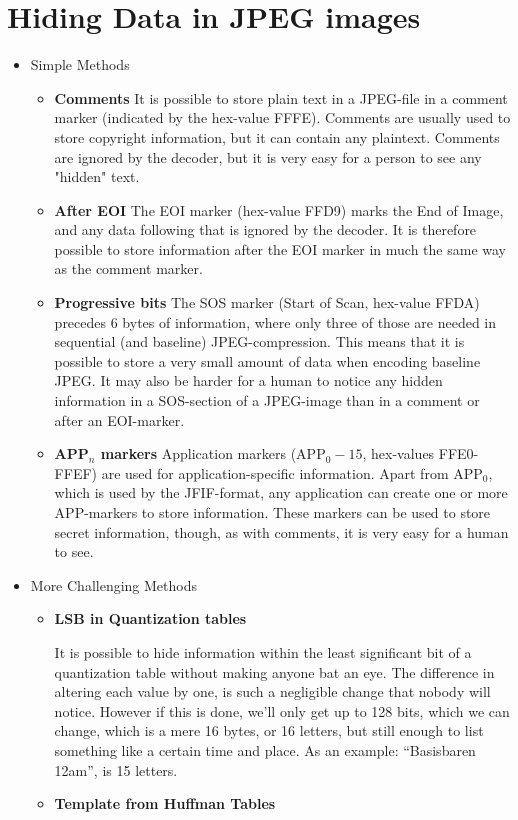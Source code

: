 
\section{Hiding Data in JPEG images}

\begin{itemize}
	\item Simple Methods
	\begin{itemize}
		\item \textbf{Comments}
		It is possible to store plain text in a JPEG-file in a comment marker (indicated by the hex-value FFFE).
		Comments are usually used to store copyright information, but it can contain any plaintext.
		Comments are ignored by the decoder, but it is very easy for a person to see any "hidden" text.

		\item \textbf{After EOI}
		The EOI marker (hex-value FFD9) marks the End of Image, and any data following that is ignored by the decoder.
		It is therefore possible to store information after the EOI marker in much the same way as the comment marker.

		\item \textbf{Progressive bits}
		The SOS marker (Start of Scan, hex-value FFDA) precedes 6 bytes of information, where only three of those are needed in sequential (and baseline) JPEG-compression.
		This means that it is possible to store a very small amount of data when encoding baseline JPEG.
		It may also be harder for a human to notice any hidden information in a SOS-section of a JPEG-image than in a comment or after an EOI-marker.

		\item \textbf{APP$_n$ markers}
		Application markers (APP$_0-15$, hex-values FFE0-FFEF) are used for application-specific information.
		Apart from APP$_0$, which is used by the JFIF-format, any application can create one or more APP-markers to store information.
		These markers can be used to store secret information, though, as with comments, it is very easy for a human to see.
	\end{itemize}
	\item More Challenging Methods
	\begin{itemize}
		\item \textbf{LSB in Quantization tables}

		It is possible to hide information within the least significant bit of a quantization table without making anyone bat an eye.
		The difference in altering each value by one, is such a negligible change that nobody will notice.
		However if this is done, we'll only get up to 128 bits, which we can change, which is a mere 16 bytes, or 16 letters, but still enough to list something like a certain time and place.
		As an example: ``Basisbaren 12am'', is 15 letters.
		\item \textbf{Template from Huffman Tables}


\end{itemize}
\end{itemize}
